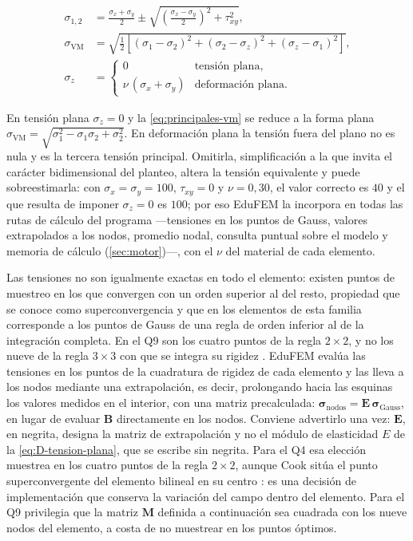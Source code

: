 \begin{equation}
\begin{aligned}
\sigma_{1,2} &= \frac{\sigma_x + \sigma_y}{2} \pm \sqrt{\left(\frac{\sigma_x - \sigma_y}{2}\right)^2 + \tau_{xy}^2}, \\
\sigma_{\mathrm{VM}} &= \sqrt{\tfrac{1}{2}\left[(\sigma_1-\sigma_2)^2 + (\sigma_2-\sigma_z)^2 + (\sigma_z-\sigma_1)^2\right]}, \\
\sigma_z &=
\begin{cases}
0 & \text{tensión plana,}\\
\nu\,(\sigma_x+\sigma_y) & \text{deformación plana.}
\end{cases}
\end{aligned}
\label{eq:principales-vm}
\end{equation}

En tensión plana $\sigma_z = 0$ y la \autoref{eq:principales-vm} se reduce a la forma plana $\sigma_{\mathrm{VM}} = \sqrt{\sigma_1^2 - \sigma_1\sigma_2 + \sigma_2^2}$. En deformación plana la tensión fuera del plano no es nula y es la tercera tensión principal. Omitirla, simplificación a la que invita el carácter bidimensional del planteo, altera la tensión equivalente y puede sobreestimarla: con $\sigma_x = \sigma_y = 100$, $\tau_{xy} = 0$ y $\nu = 0{,}30$, el valor correcto es $40$ y el que resulta de imponer $\sigma_z = 0$ es $100$; por eso EduFEM la incorpora en todas las rutas de cálculo del programa —tensiones en los puntos de Gauss, valores extrapolados a los nodos, promedio nodal, consulta puntual sobre el modelo y memoria de cálculo (\autoref{sec:motor})—, con el $\nu$ del material de cada elemento.

Las tensiones no son igualmente exactas en todo el elemento: existen puntos de muestreo en los que convergen con un orden superior al del resto, propiedad que se conoce como superconvergencia y que en los elementos de esta familia corresponde a los puntos de Gauss de una regla de orden inferior al de la integración completa. En el Q9 son los cuatro puntos de la regla $2\times2$, y no los nueve de la regla $3\times3$ con que se integra su rigidez \autocite[pp.~230-231]{cook2002concepts}. EduFEM evalúa las tensiones en los puntos de la cuadratura de rigidez de cada elemento y las lleva a los nodos mediante una extrapolación, es decir, prolongando hacia las esquinas los valores medidos en el interior, con una matriz precalculada: $\bm{\sigma}_{\text{nodos}} = \bm{E}\,\bm{\sigma}_{\text{Gauss}}$, en lugar de evaluar $\bm{B}$ directamente en los nodos. Conviene advertirlo una vez: $\bm{E}$, en negrita, designa la matriz de extrapolación y no el módulo de elasticidad $E$ de la \autoref{eq:D-tension-plana}, que se escribe sin negrita. Para el Q4 esa elección muestrea en los cuatro puntos de la regla $2\times2$, aunque Cook sitúa el punto superconvergente del elemento bilineal en su centro \autocite[p.~230]{cook2002concepts}: es una decisión de implementación que conserva la variación del campo dentro del elemento. Para el Q9 privilegia que la matriz $\bm{M}$ definida a continuación sea cuadrada con los nueve nodos del elemento, a costa de no muestrear en los puntos óptimos.

